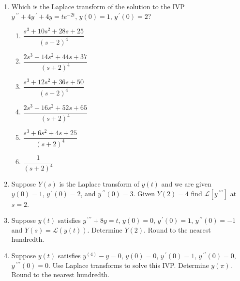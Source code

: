 \documentclass{ximera}
\begin{document}
\begin{enumerate}[label=(\arabic*)]

\newpage


\item  Which is the Laplace transform of the solution to the IVP \\$y\,^{\prime\prime}+4y\,^{\prime}+4y=te^{-2t}$, $y(0)=1$, $y^{\,\prime}(0)=2$?







\begin{enumerate}[label=(\alph*)]
\item $\dfrac{s^3+10s^2+28s+25}{(s+2)^4}$  %
\item $\dfrac{2s^3+14s^2+44s+37}{(s+2)^4}$
\item $\dfrac{s^3+12s^2+36s+50}{(s+2)^4}$
\item $\dfrac{2s^3+16s^2+52s+65}{(s+2)^4}$
\item $\dfrac{s^3+6s^2+4s+25}{(s+2)^4}$
\item $\dfrac{1}{(s+2)^4}$
\end{enumerate}



\item Suppose $Y(s)$ is the Laplace transform of $y(t)$ and we are given $y(0)=1$, $y\,^{\prime}(0)=2$, and $y\,^{\prime\prime}(0)=3$.  Given $Y(2)=4$ find $\mathcal{L}[y\,^{\prime\prime\prime}]$ at $s=2$.



\item Suppose $y(t)$ satisfies $y^{\,\prime\prime\prime}+8y=t$, $y(0)=0$, $y^{\,\prime}(0)=1$, $y^{\,\prime\prime}(0)=-1$ and $Y(s)=\mathcal{L}(y(t))$.  Determine $Y(2)$.  Round to the nearest hundredth.




\item Suppose $y(t)$ satisfies $y^{(4)}-y=0$, $y(0)=0$, $y\,^{\prime}(0)=1$, $y\,^{\prime\prime}(0)=0$, $y\,^{\prime\prime\prime}(0)=0$.  Use Laplace transforms to solve this IVP. Determine $y(\pi)$.  Round to the nearest hundredth.



\end{enumerate}
\end{document}
